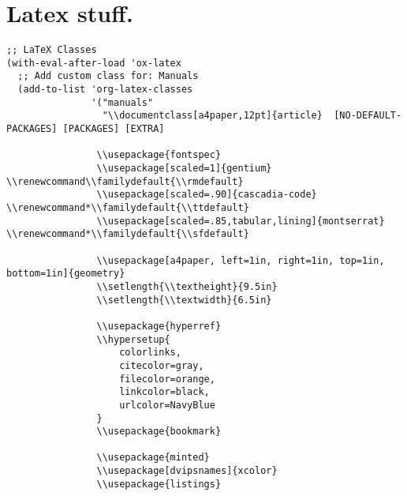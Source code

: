 \documentclass[11pt]{article}
\begin{document}
\section{Latex stuff.}
\label{sec:org69b02bd}
\begin{verbatim}
;; LaTeX Classes
(with-eval-after-load 'ox-latex
  ;; Add custom class for: Manuals
  (add-to-list 'org-latex-classes
               '("manuals"
                 "\\documentclass[a4paper,12pt]{article}  [NO-DEFAULT-PACKAGES] [PACKAGES] [EXTRA]

                \\usepackage{fontspec}
                \\usepackage[scaled=1]{gentium} \\renewcommand\\familydefault{\\rmdefault} 
                \\usepackage[scaled=.90]{cascadia-code} \\renewcommand*\\familydefault{\\ttdefault}
                \\usepackage[scaled=.85,tabular,lining]{montserrat} \\renewcommand*\\familydefault{\\sfdefault}

                \\usepackage[a4paper, left=1in, right=1in, top=1in, bottom=1in]{geometry}
                \\setlength{\\textheight}{9.5in}
                \\setlength{\\textwidth}{6.5in}

                \\usepackage{hyperref}
                \\hypersetup{
                    colorlinks,
                    citecolor=gray,
                    filecolor=orange,
                    linkcolor=black,
                    urlcolor=NavyBlue
                }
                \\usepackage{bookmark}

                \\usepackage{minted}
                \\usepackage[dvipsnames]{xcolor}
                \\usepackage{listings}


\end{verbatim}
\end{document}
